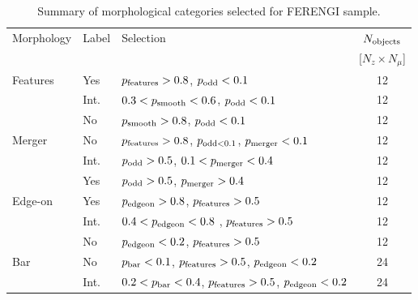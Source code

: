 \documentclass[usenatbib]{mn2e}
\begin{document}
\begin{table}
\caption{Summary of morphological categories selected for FERENGI sample.\label{tbl:morphologies}}
\begin{tabular}{lllc}
\hline\hline
Morphology          & Label &  Selection                                                                                            & $N_{\rm objects}$ \\
                    &       &                                                                                                       & [$N_z \times N_\mu$] \\
\hline
Features            & Yes       & $p_{\rm features} > 0.8$, $p_{\rm odd} < 0.1$                                                         & 12 \\ 
                    & Int.      & $0.3 < p_{\rm smooth} < 0.6$, $p_{\rm odd} < 0.1$                                                     & 12 \\ 
                    & No        & $p_{\rm smooth} > 0.8$, $p_{\rm odd} < 0.1$                                                           & 12 \\ 
Merger              & No        & $p_{\rm features} > 0.8$, $p_{\rm odd < 0.1}$, $p_{\rm merger} < 0.1$                                 & 12 \\
                    & Int.      & $p_{\rm odd} > 0.5$, $0.1< p_{\rm merger} < 0.4$                                                      & 12 \\ 
                    & Yes       & $p_{\rm odd} > 0.5$, $p_{\rm merger} > 0.4$                                                           & 12 \\
Edge-on             & Yes       & $p_{\rm edgeon} > 0.8$, $p_{\rm features} > 0.5$                                                      & 12 \\
                    & Int.      & $0.4 < p_{\rm edgeon} < 0.8$ , $p_{\rm features} > 0.5$                                               & 12 \\
                    & No        & $p_{\rm edgeon} < 0.2$, $p_{\rm features} > 0.5$                                                      & 12 \\
Bar                 & No        & $p_{\rm bar} < 0.1$, $p_{\rm features} > 0.5$, $p_{\rm edgeon} < 0.2$                                 & 24 \\
                    & Int.      & $0.2 < p_{\rm bar} < 0.4$, $p_{\rm features} > 0.5$, $p_{\rm edgeon} < 0.2$                           & 24 \\

\end{tabular}
\end{table}
\end{document}
